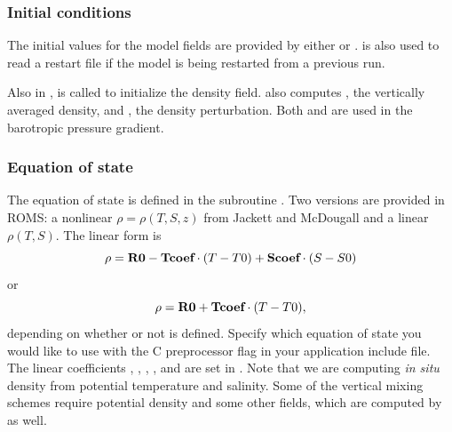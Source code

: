
\subsubsection{Initial conditions}
The initial values for the model fields are provided by either
 or .   is
also used to read a restart file if the model is being restarted from a
previous run.

Also in ,  is called to initialize
the density field.  also computes ,
the vertically averaged density, and , the density
perturbation. Both  and  are used in the barotropic
pressure gradient.


\subsubsection{Equation of state}
The equation of state is defined in the subroutine .  Two
versions are provided in ROMS: a nonlinear $\rho =
\rho(T,S,z)$ from Jackett and McDougall \cite{Jackett} and a linear
$\rho(T,S)$.  The linear form is
$$
      \rho = \mbox{\bf R0} - \mbox{\bf Tcoef} \cdot (T-T0) +
      \mbox{\bf Scoef} \cdot (S-S0)
$$
or
$$
     \rho = \mbox{\bf R0} + \mbox{\bf Tcoef} \cdot (T-T0),
$$
depending on whether or not
 is defined.  Specify which equation of state you
would like to use with the  C preprocessor flag in your
application include file. The linear coefficients , ,
, , and  are set in . Note
that we are computing {\em in situ} density from potential temperature and
salinity. Some of the vertical mixing schemes require potential density
and some other fields, which are computed by  as well.

